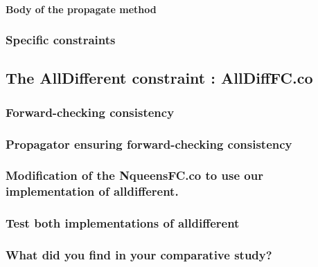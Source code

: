 \documentclass{eplDoc}
\begin{document}
\paragraph{Body of the propagate method}

\subsubsection{Specific constraints}

\subsection{The AllDifferent constraint : AllDiffFC.co} %

\subsubsection{Forward-checking consistency}

\subsubsection{Propagator ensuring forward-checking consistency}

\subsubsection{Modification of the NqueensFC.co to use our implementation of alldifferent.}

\subsubsection{Test both implementations of alldifferent}

\subsubsection{What did you find in your comparative study?}
\end{document}
